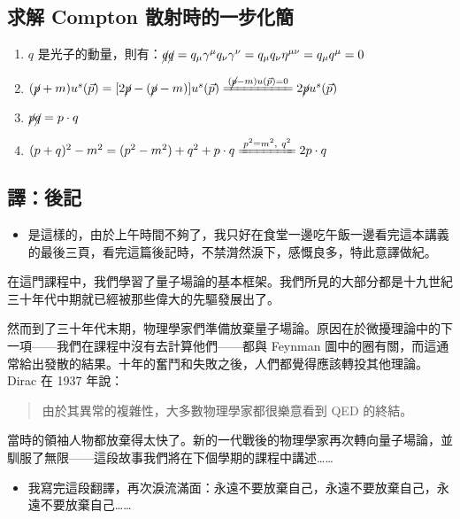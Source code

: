 \documentclass{article}
\begin{document}
\subsection{求解 Compton 散射時的一步化簡}

\begin{enumerate}
\item $q$ 是光子的動量，則有：$\cancel{q}\cancel{q}=q_{\mu}\gamma^{\mu}q_{\nu}\gamma^{\nu}=q_{\mu}q_{\nu}\eta^{\mu\nu}=q_{\mu}q^{\mu}=0$
\item $(\cancel{p}+m)u^s(\vec{p})=[2\cancel{p}-(\cancel{p}-m)]u^s(\vec{p})\xlongequal{(\cancel{p}-m)u(\vec{p})=0}2\cancel{p}u^s(\vec{p})$
\item $\cancel{p}\cancel{q}=p\cdot q$
\item $(p+q)^2-m^2=(p^2-m^2)+q^2+p\cdot q\xlongequal{p^2=m^2,\ q^2}2p\cdot q$
\end{enumerate}

\subsection{譯：後記}

\begin{itemize}
\item 是這樣的，由於上午時間不夠了，我只好在食堂一邊吃午飯一邊看完這本講義的最後三頁，看完這篇後記時，不禁潸然淚下，感慨良多，特此意譯做紀。
\end{itemize}

在這門課程中，我們學習了量子場論的基本框架。我們所見的大部分都是十九世紀三十年代中期就已經被那些偉大的先驅發展出了。

然而到了三十年代末期，物理學家們準備放棄量子場論。原因在於微擾理論中的下一項——我們在課程中沒有去計算他們——都與 Feynman 圖中的圈有關，而這通常給出發散的結果。十年的奮鬥和失敗之後，人們都覺得應該轉投其他理論。Dirac 在 1937 年說：

\begin{quote}
由於其異常的複雜性，大多數物理學家都很樂意看到 QED 的終結。
\end{quote}

當時的領袖人物都放棄得太快了。新的一代戰後的物理學家再次轉向量子場論，並馴服了無限——這段故事我們將在下個學期的課程中講述……

\begin{itemize}
\item 我寫完這段翻譯，再次淚流滿面：永遠不要放棄自己，永遠不要放棄自己，永遠不要放棄自己……
\end{itemize}
\end{document}
